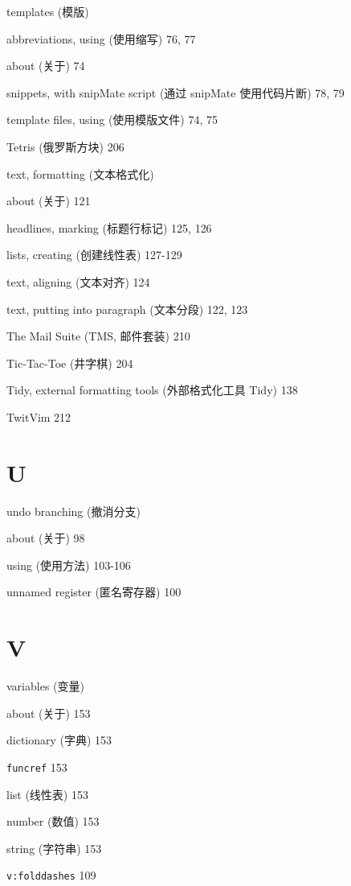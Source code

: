\begin{multicols}{2}
templates (模版) \par
  abbreviations, using (使用缩写) 76, 77 \par
  about (关于) 74 \par
  snippets, with snipMate script (通过 snipMate 使用代码片断) 78, 79 \par
  template files, using (使用模版文件) 74, 75 \par

Tetris (俄罗斯方块) 206

text, formatting (文本格式化) \par
  about (关于) 121 \par
  headlines, marking (标题行标记) 125, 126 \par
  lists, creating (创建线性表) 127-129 \par
  text, aligning (文本对齐) 124 \par
  text, putting into paragraph (文本分段) 122, 123 \par

The Mail Suite (TMS, 邮件套装) 210

Tic-Tac-Toe (井字棋) 204

Tidy, external formatting tools (外部格式化工具 Tidy) 138

TwitVim 212

\section*{U}

undo branching (撤消分支) \par
  about (关于) 98 \par
  using (使用方法) 103-106 \par

unnamed register (匿名寄存器) 100

\section*{V}

variables (变量) \par
  about (关于) 153 \par
  dictionary (字典) 153 \par
  \texttt{funcref} 153 \par
  list (线性表) 153 \par
  number (数值) 153 \par
  string (字符串) 153 \par

\texttt{v:folddashes} 109


\end{multicols}
